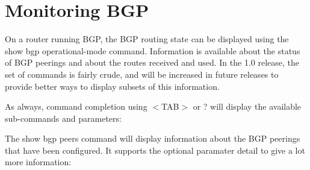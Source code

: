 \section{Monitoring BGP}

On a router running BGP, the BGP routing state can be displayed using
the {\stt show bgp} operational-mode command.  Information is available
about the status of BGP peerings and about the routes received and
used.  In the 1.0 release, the set of commands is fairly crude, and
will be increased in future releases to provide better ways to display
subsets of this information.

As always, command completion using $<$TAB$>$ or ? will display the
available sub-commands and parameters:

\vspace{0.1in}
\noindent{}

The {\stt show bgp peers} command will display information about the
BGP peerings that have been configured.  It supports the optional
paramater {\stt detail} to give a lot more information:

\vspace{0.1in}
\noindent{}

